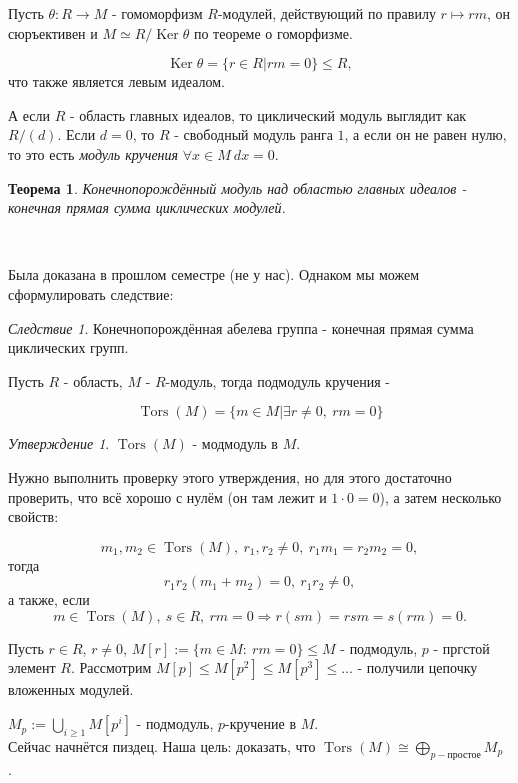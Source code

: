 \documentclass[a4paper,100pt]{article}
\theoremstyle{indented}
\newtheorem{theorem}{Теорема}
\theoremstyle{definition}
\theoremstyle{remark}
\newtheorem{cons}{Следствие}
\newtheorem{stat}{Утверждение}
\DeclareMathOperator{\Ker}{Ker}
\DeclareMathOperator{\Tors}{Tors}
\begin{document}
Пусть $\theta: R\rightarrow M$ - гомоморфизм $R$-модулей, действующий по правилу $r\mapsto rm$, он сюръективен и $M\simeq R/\Ker \theta$ по теореме о гоморфизме.

\[
    \Ker\theta = \{r\in R\vert rm=0\} \leq R, 
\]
что также является левым идеалом.\ 

А если $R$ - область главных идеалов, то циклический модуль выглядит как $R/(d)$. Если $d = 0$, то $R$ - свободный модуль ранга $1$, а если он не равен нулю, то это есть \textit{модуль кручения} $\forall x\in M \: dx=0$.\\

\begin{theorem}
    Конечнопорождённый модуль над областью главных идеалов - конечная прямая сумма циклических модулей.
\end{theorem}\

Была доказана в прошлом семестре (не у нас). Однаком мы можем сформулировать следствие:

\begin{cons}
    Конечнопорождённая абелева группа - конечная прямая сумма циклических групп.
\end{cons}

Пусть $R$ - область, $M$ - $R$-модуль, тогда подмодуль кручения - 

\[
    \Tors (M) = \{m\in M\vert \exists r\neq 0, \: rm=0\}
\]

\begin{stat}
    $\Tors (M)$ - модмодуль в $M$.
\end{stat}

Нужно выполнить проверку этого утверждения, но для этого достаточно проверить, что всё хорошо с нулём (он там лежит и $1\cdot 0 = 0$), а затем несколько свойств:

\[
    m_1, m_2\in \Tors (M), \: r_1, r_2 \neq 0, \: r_1m_1=r_2m_2=0, 
\]
тогда
\[
    r_1r_2(m_1+m_2)=0, \: r_1r_2\neq 0, 
\]
а также, если
\[
    m\in \Tors (M), \: s\in R, \: rm=0 \Rightarrow r(sm)=rsm=s(rm)=0.
\]

Пусть $r\in R$, $r\neq 0$, $M[r]:=\{m\in M:\: rm=0\}\leq M$ - подмодуль, $p$ - пргстой элемент $R$. Рассмотрим $M[p]\leq M[p^2]\leq M[p^3]\leq \ldots$ - получили цепочку вложенных модулей.\ 

$M_p:=\bigcup_{i\geq 1}M[p^i]$ - подмодуль, $p$-кручение в $M$. \\

Сейчас начнётся пиздец. Наша цель: доказать, что $\Tors (M)\cong \bigoplus_{p-\text{простое}} M_p$.\ 
\end{document}
